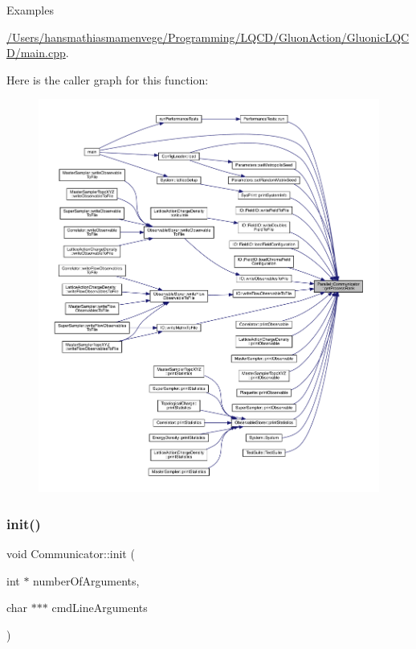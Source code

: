 \begin{Desc}
\item[Examples]\par
\mbox{\hyperlink{_2_users_2hansmathiasmamenvege_2_programming_2_l_q_c_d_2_gluon_action_2_gluonic_l_q_c_d_2main_8cpp-example}{/\+Users/hansmathiasmamenvege/\+Programming/\+L\+Q\+C\+D/\+Gluon\+Action/\+Gluonic\+L\+Q\+C\+D/main.\+cpp}}.\end{Desc}
Here is the caller graph for this function\+:
\nopagebreak
\begin{figure}[H]
\begin{center}
\leavevmode
\includegraphics[width=350pt]{class_parallel_1_1_communicator_a474ab433da0e83ef372d74e26a7e5cb0_icgraph}
\end{center}
\end{figure}
\mbox{\label{class_parallel_1_1_communicator_a4ed2a77c33cd899b31131e44fc906fd7}} 
\subsubsection{\texorpdfstring{init()}{init()}}
{\footnotesize\ttfamily void Communicator\+::init (\begin{DoxyParamCaption}\item[{int $\ast$}]{number\+Of\+Arguments,  }\item[{char $\ast$$\ast$$\ast$}]{cmd\+Line\+Arguments }\end{DoxyParamCaption})\hspace{0.3cm}{\ttfamily [static]}}



